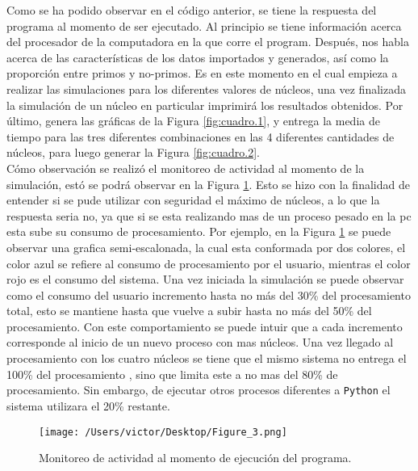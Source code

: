 \documentclass{article}
\begin{document}
Como se ha podido observar en el  código anterior, se tiene la respuesta del programa al momento de ser ejecutado. Al principio se tiene información acerca del procesador de la computadora en la que corre el program. Después, nos habla acerca de las características  de los datos importados y generados, así como la proporción entre primos y no-primos.
Es en este momento en el cual empieza a realizar las simulaciones para los diferentes valores de núcleos, una vez finalizada la simulación de un núcleo en particular imprimirá los resultados obtenidos. Por último, genera las gráficas de la Figura \ref{fig:cuadro.1}, y   entrega  la media  de tiempo para las tres diferentes combinaciones en las 4 diferentes cantidades de núcleos, para luego generar la Figura \ref{fig:cuadro.2}.\\

Cómo observación se realizó el monitoreo de actividad al momento de la simulación, estó se podrá observar en la Figura \ref{fig:cuadro.3}. Esto se hizo con la finalidad de entender si se pude utilizar con seguridad el máximo de núcleos, a lo que la respuesta seria no, ya que si se esta realizando mas de un proceso pesado en la pc esta sube su consumo de procesamiento. Por ejemplo, en la Figura \ref{fig:cuadro.3} se puede observar una grafica semi-escalonada, la cual esta conformada por dos colores, el color azul se refiere al consumo de procesamiento por el usuario, mientras el color rojo es el consumo del sistema. Una vez iniciada la simulación se puede observar como el consumo del usuario incremento hasta no más del 30\% del procesamiento total, esto se mantiene hasta que vuelve a subir hasta no más del 50\%  del procesamiento. Con este comportamiento se puede intuir que a cada incremento corresponde al inicio de un nuevo proceso con mas núcleos. Una vez llegado al procesamiento con los cuatro núcleos se tiene que el mismo sistema no entrega el 100\% del procesamiento , sino que limita este a no mas del 80\% de procesamiento. Sin embargo, de ejecutar otros procesos diferentes a \texttt{Python} el sistema utilizara el 20\% restante. \\


\begin{figure}[H]
\begin{center}
	\texttt{[image: /Users/victor/Desktop/Figure\_3.png]}
	\caption{Monitoreo de actividad al momento de ejecución del programa.}
	\label{fig:cuadro.3}
\end{center}
\end{figure}
\end{document}
